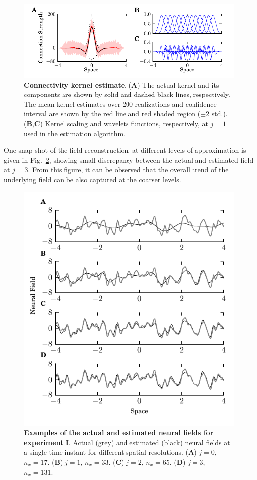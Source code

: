 \documentclass[review,authoryear,3p]{elsarticle}
\begin{document}
\begin{figure}[!t]  
 \centering
\includegraphics{./Graph/fig9.pdf}
\caption{ {\bf Connectivity kernel estimate}. (\textbf{A}) The actual kernel and its components are shown by solid and dashed black lines, respectively. The mean kernel estimates over 200 realizations and confidence interval are shown by the red line and red shaded region ($\pm2$ std.). (\textbf{B},\textbf{C}) Kernel scaling and wavelets functions, respectively, at $j=1$ used in the estimation algorithm.}
\label{fig:KernelEstimate}
\end{figure}

One snap shot of the field reconstruction, at different levels of approximation is given in Fig.~\ref{fig:FieldEstimates100}, showing small discrepancy between the actual and estimated field at $j=3$. From this figure, it can be observed that the overall trend of the underlying field can be also captured at the coarser levels.
\begin{figure}[!t]
\centering
\includegraphics{./Graph/fig10.pdf}
\caption{ {\bf Examples of the actual and estimated neural fields for experiment I}. Actual (grey) and estimated (black) neural fields at a single time instant for different spatial resolutions. (\textbf{A}) $j=0$, $n_x=17$. (\textbf{B}) $j=1$, $n_x=33$. (\textbf{C}) $j=2$, $n_x=65$. (\textbf{D}) $j=3$, $n_x=131$.}
\label{fig:FieldEstimates100}
\end{figure}
\end{document}
